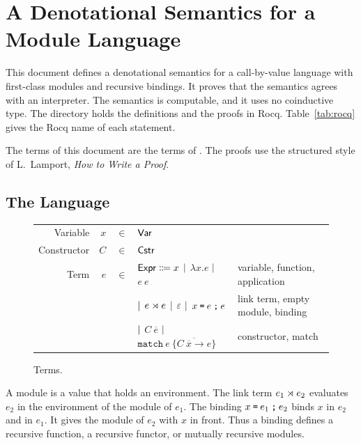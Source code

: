 \section{A Denotational Semantics for a Module Language}

This document defines a denotational semantics for a call-by-value language with first-class modules and recursive bindings.
It proves that the semantics agrees with an interpreter.
The semantics is computable, and it uses no coinductive type.
The directory  holds the definitions and the proofs in Rocq.
Table~\ref{tab:rocq} gives the Rocq name of each statement.

The terms of this document are the terms of .
The proofs use the structured style of L.~Lamport, \emph{How to Write a Proof}.

\subsection{The Language}

\begin{figure}[h]
  \small
  \centering
  \begin{tabular}{rrcll}
    Variable    & $x$ & $\in$ & $\mathsf{Var}$                                           &                  \\
    Constructor & $C$ & $\in$ & $\mathsf{Cstr}$                                          &                  \\
    Term        & $e$ & $\in$ & $\mathsf{Expr}\Coloneqq x$ $|$ $\lambda x.e$ $|$ $e\:e$ & variable, function, application \\
                &     &       & $|$ $e\rtimes e$ $|$ $\varepsilon$ $|$ ${x}\:\texttt{=}\:{e} \:\texttt{;}\: {e}$ & link term, empty module, binding \\
                &     &       & $|$ $C\:\overline{e}$ $|$ $\texttt{match}\:e\:\{\overline{C\:\overline{x}\rightarrow e}\}$ & constructor, match
  \end{tabular}
  \caption{Terms.}
  \label{fig:syntax}
\end{figure}

A module is a value that holds an environment.
The link term $e_1\rtimes e_2$ evaluates $e_2$ in the environment of the module of $e_1$.
The binding ${x}\:\texttt{=}\:{e_1} \:\texttt{;}\: {e_2}$ binds $x$ in $e_2$ and in $e_1$.
It gives the module of $e_2$ with $x$ in front.
Thus a binding defines a recursive function, a recursive functor, or mutually recursive modules.

